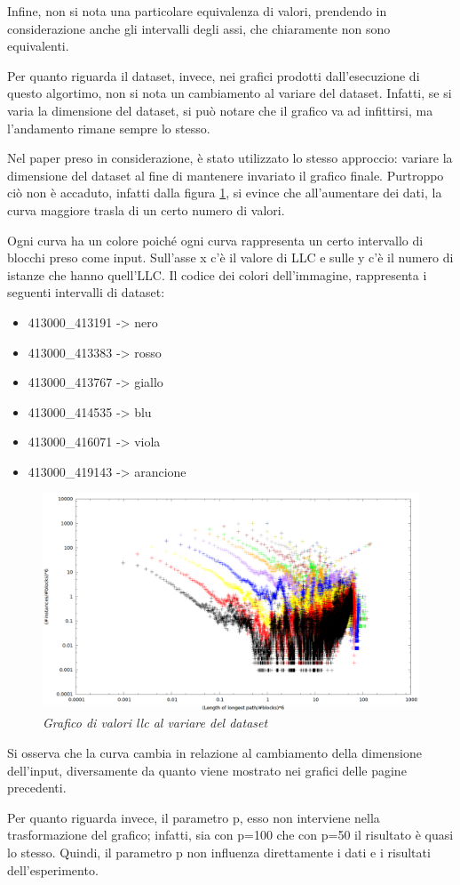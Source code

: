 Infine, non si nota una particolare equivalenza di valori, prendendo in considerazione anche gli intervalli degli assi, che chiaramente non sono equivalenti.

Per quanto riguarda il dataset, invece, nei grafici prodotti dall'esecuzione di questo algortimo, non si nota un cambiamento al variare del dataset. Infatti, se si varia la dimensione del dataset, si può notare che il grafico va ad infittirsi, ma l'andamento rimane sempre lo stesso. 

Nel paper preso in considerazione, è stato utilizzato lo stesso approccio: variare la dimensione del dataset al fine di mantenere invariato il grafico finale. Purtroppo ciò non è accaduto, infatti dalla figura \ref{papergraph2}, si evince che all'aumentare dei dati, la curva maggiore trasla di un certo numero di valori.

Ogni curva ha un colore poiché ogni curva rappresenta un certo intervallo di blocchi preso come input. Sull'asse x c’è il valore di LLC e sulle y c’è il numero di istanze che hanno quell’LLC.
\newpage
Il codice dei colori dell'immagine, rappresenta i seguenti intervalli di dataset:
\begin{itemize}
\item 413000_413191 -> nero
\item 413000_413383 -> rosso
\item 413000_413767 -> giallo
\item 413000_414535 -> blu
\item 413000_416071 -> viola
\item 413000_419143 -> arancione
\end{itemize}


\begin{figure}
	\centering
	\includegraphics[width=\textwidth]{figure/papergraphlogscale}
	\caption{\textit{Grafico di valori llc al variare del dataset \cite{ddp-ltcbh-17} }\label{papergraph2}}
\end{figure}

Si osserva che la curva cambia in relazione al cambiamento della dimensione dell'input, diversamente da quanto viene mostrato nei grafici delle pagine precedenti.

Per quanto riguarda invece, il parametro p, esso non interviene nella trasformazione del grafico; infatti, sia con p=100 che con p=50 il risultato è quasi lo stesso. 
Quindi, il parametro p non influenza direttamente i dati e i risultati dell'esperimento.